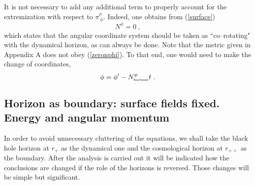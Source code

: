 \documentclass[a4paper,preprintnumbers,amsmath,amssymb]{revtex4}
\begin{document}
It is not necessary to add any additional term to properly account for the extremization
with respect to $\pi_{\ \phi}^{\rho}$. Indeed, one obtains from (\ref{surface})
\begin{equation}
N^{\phi} = 0 \ ,
\label{zeronphi}
\end{equation}
which states that the angular coordinate system  should be taken as ``co--rotating"
with the dynamical horizon, as can always be done.  Note that the metric given in Appendix A does not obey (\ref{zeronphi}). To that end,
one would need to make the change of coordinates,
\begin{equation}
\phi =  \phi'-N^{\phi}_{\mbox{\tiny horizon}}t \ .
\label{ccc}
\end{equation}


\subsection*{Horizon as boundary: surface fields fixed. Energy and angular momentum}

In order to avoid unnecessary cluttering of the equations, we shall take
the black hole horizon at $r_+$ as the dynamical one and the cosmological horizon at
$r_{++}$ as the boundary. After the analysis is carried out it will be indicated
how the conclusions are changed if the role of the horizons is reversed. Those changes
will be simple but significant.
\end{document}
